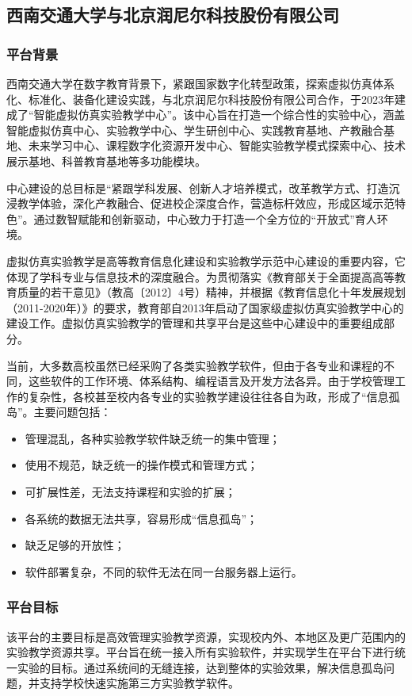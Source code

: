\subsection{西南交通大学与北京润尼尔科技股份有限公司}

\subsubsection{平台背景}

西南交通大学在数字教育背景下，紧跟国家数字化转型政策，探索虚拟仿真体系化、标准化、装备化建设实践，与北京润尼尔科技股份有限公司合作，于2023年建成了“智能虚拟仿真实验教学中心”。该中心旨在打造一个综合性的实验中心，涵盖智能虚拟仿真中心、实验教学中心、学生研创中心、实践教育基地、产教融合基地、未来学习中心、课程数字化资源开发中心、智能实验教学模式探索中心、技术展示基地、科普教育基地等多功能模块。

中心建设的总目标是“紧跟学科发展、创新人才培养模式，改革教学方式、打造沉浸教学体验，深化产教融合、促进校企深度合作，营造标杆效应，形成区域示范特色”。通过数智赋能和创新驱动，中心致力于打造一个全方位的“开放式”育人环境。

虚拟仿真实验教学是高等教育信息化建设和实验教学示范中心建设的重要内容，它体现了学科专业与信息技术的深度融合。为贯彻落实《教育部关于全面提高高等教育质量的若干意见》（教高〔2012〕4号）精神，并根据《教育信息化十年发展规划（2011-2020年）》的要求，教育部自2013年启动了国家级虚拟仿真实验教学中心的建设工作。虚拟仿真实验教学的管理和共享平台是这些中心建设中的重要组成部分。

当前，大多数高校虽然已经采购了各类实验教学软件，但由于各专业和课程的不同，这些软件的工作环境、体系结构、编程语言及开发方法各异。由于学校管理工作的复杂性，各校甚至校内各专业的实验教学建设往往各自为政，形成了“信息孤岛”。主要问题包括：

\begin{itemize}
    \item 管理混乱，各种实验教学软件缺乏统一的集中管理；
    \item 使用不规范，缺乏统一的操作模式和管理方式；
    \item 可扩展性差，无法支持课程和实验的扩展；
    \item 各系统的数据无法共享，容易形成“信息孤岛”；
    \item 缺乏足够的开放性；
    \item 软件部署复杂，不同的软件无法在同一台服务器上运行。
\end{itemize}

\subsubsection{平台目标}
该平台的主要目标是高效管理实验教学资源，实现校内外、本地区及更广范围内的实验教学资源共享。平台旨在统一接入所有实验软件，并实现学生在平台下进行统一实验的目标。通过系统间的无缝连接，达到整体的实验效果，解决信息孤岛问题，并支持学校快速实施第三方实验教学软件。

